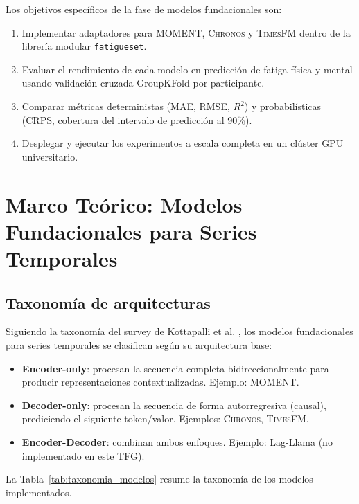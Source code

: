 \documentclass[12pt, a4paper]{article}
\newcommand{\code}[1]{\texttt{#1}}
\newcommand{\moment}{\textsc{MOMENT}}
\newcommand{\chronos}{\textsc{Chronos}}
\newcommand{\timesfm}{\textsc{TimesFM}}
\begin{document}
Los objetivos específicos de la fase de modelos fundacionales son:
\begin{enumerate}[label=(\alph*)]
    \item Implementar adaptadores para \moment{}, \chronos{} y \timesfm{} dentro de la librería modular \code{fatigueset}.
    \item Evaluar el rendimiento de cada modelo en predicción de fatiga física y mental usando validación cruzada GroupKFold por participante.
    \item Comparar métricas deterministas (MAE, RMSE, $R^2$) y probabilísticas (CRPS, cobertura del intervalo de predicción al 90\%).
    \item Desplegar y ejecutar los experimentos a escala completa en un clúster GPU universitario.
\end{enumerate}


\section{Marco Teórico: Modelos Fundacionales para Series Temporales}
\label{sec:marco_teorico}

\subsection{Taxonomía de arquitecturas}

Siguiendo la taxonomía del survey de Kottapalli et al. \cite{kottapalli2025survey}, los modelos fundacionales para series temporales se clasifican según su arquitectura base:

\begin{itemize}
    \item \textbf{Encoder-only}: procesan la secuencia completa bidireccionalmente para producir representaciones contextualizadas. Ejemplo: \moment{}.
    \item \textbf{Decoder-only}: procesan la secuencia de forma autorregresiva (causal), prediciendo el siguiente token/valor. Ejemplos: \chronos{}, \timesfm{}.
    \item \textbf{Encoder-Decoder}: combinan ambos enfoques. Ejemplo: Lag-Llama (no implementado en este TFG).
\end{itemize}

La Tabla~\ref{tab:taxonomia_modelos} resume la taxonomía de los modelos implementados.
\end{document}
